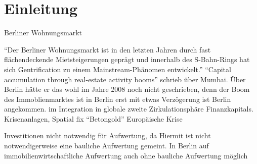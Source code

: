 \section{Einleitung}\label{sec:Einleitung}
 Berliner Wohnungsmarkt

"`Der Berliner Wohnungsmarkt ist in den letzten Jahren durch fast flächendeckende Mietsteigerungen geprägt und innerhalb des S-Bahn-Rings hat sich Gentrification zu einem Mainstream-Phänomen entwickelt."' \citep[S.~29]{Berner2015}
"`Capital accumulation through real-estate activity booms"' schrieb \citet[S.~35]{Harvey2008} über Mumbai. Über Berlin hätte er das wohl im Jahre 2008 noch nicht geschrieben, denn der Boom des Immoblienmarktes ist in Berlin erst mit etwas Verzögerung ist Berlin angekommen. im Integration in globale zweite Zirkulationsphäre Finanzkapitals. Krisenanlagen, Spatial fix "`Betongold"' Europäische Krise 

Investitionen nicht notwendig für Aufwertung, da 
Hiermit ist nicht notwendigerweise eine bauliche Aufwertung gemeint. In Berlin auf immobilienwirtschaftliche Aufwertung auch ohne bauliche Aufwertung möglich \citep[S.~30]{Berner2015} 

 

